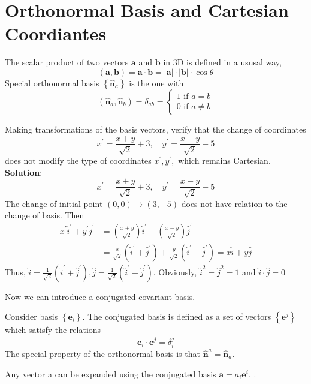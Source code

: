 \section{Orthonormal Basis and Cartesian Coordiantes}
The scalar product of two vectors $\mathbf{a}$ and $\mathbf{b}$ in 3D is defined in a ususal way,
\begin{equation}
(\mathbf{a}, \mathbf{b})=\mathbf{a}\cdot\mathbf{b}=|\mathbf{a}| \cdot|\mathbf{b}| \cdot \cos \theta
\end{equation}
Special orthonormal basis $\left\{\hat{\mathbf{n}}_{a}\right\}$ is the one with
\begin{equation}
\left(\hat{\mathbf{n}}_{a}, \hat{\mathbf{n}}_{b}\right)=\delta_{a b}=\left\{\begin{array}{l}
{1 \text { if } a=b} \\
{0 \text { if } a \neq b}
\end{array}\right.
\end{equation}
\begin{example}
Making transformations of the basis vectors, verify that the change of coordinates
$$
x^{\prime}=\frac{x+y}{\sqrt{2}}+3, \quad y^{\prime}=\frac{x-y}{\sqrt{2}}-5
$$
does not modify the type of coordinates $x^{\prime}, y^{\prime},$ which remains Cartesian.
\textbf{Solution}:
$$
x^{\prime}=\frac{x+y}{\sqrt{2}}+3, \quad y^{\prime}=\frac{x-y}{\sqrt{2}}-5
$$
The change of initial point $(0,0) \rightarrow(3,-5)$ does not have relation to the change of basis. Then
$$
\begin{aligned}
x^{\prime} \hat{i}^{\prime}+y^{\prime} \hat{j}^{\prime} &=\left(\frac{x+y}{\sqrt{2}}\right) \hat{i}^{\prime}+\left(\frac{x-y}{\sqrt{2}}\right) \hat{j}^{\prime} \\
&=\frac{x}{\sqrt{2}}\left(\hat{i}^{\prime}+\hat{j}^{\prime}\right)+\frac{y}{\sqrt{2}}\left(\hat{i}^{\prime}-\hat{j}^{\prime}\right)=x \hat{i}+y \hat{j}
\end{aligned}
$$
Thus, $\hat{i}=\frac{1}{\sqrt{2}}\left(\hat{i}^{\prime}+\hat{j}^{\prime}\right), \hat{j}=\frac{1}{\sqrt{2}}\left(\hat{i}^{\prime}-\hat{j}^{\prime}\right) .$ Obviously, $\hat{i}^{2}=\hat{j}^{2}=1$ and $\hat{i} \cdot \hat{j}=0$
\end{example}
Now we can introduce a conjugated covariant basis.
\begin{qt}
Consider basis $\left\{\mathbf{e}_{i}\right\} .$ The conjugated basis is defined as a set of vectors $\left\{\mathbf{e}^{j}\right\}$ which satisfy the relations
\begin{equation}
\mathbf{e}_{i} \cdot \mathbf{e}^{j}=\delta_{i}^{j}
\end{equation}
The special property of the orthonormal basis is that $\hat{\mathbf{n}}^{a}=\hat{\mathbf{n}}_{a}$.

Any vector a can be expanded using the conjugated basis $\mathbf{a}=a_{i} \mathbf{e}^{i} .$ .
\end{qt}
